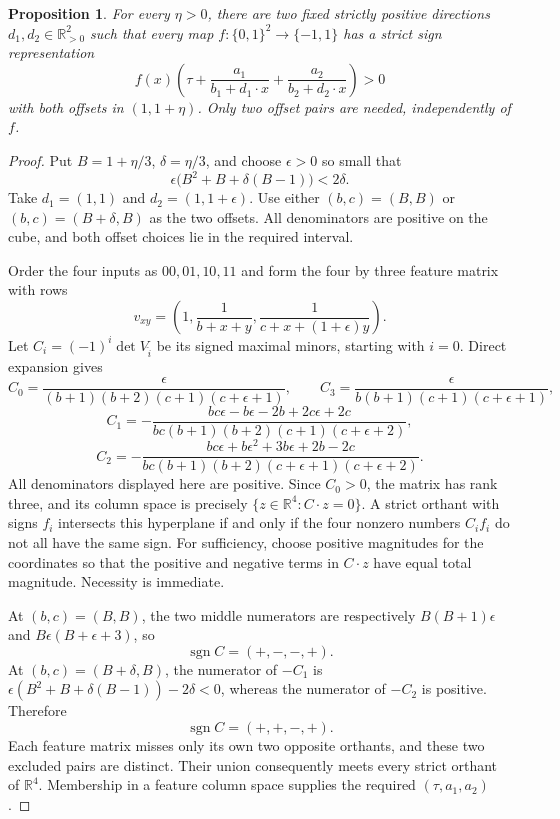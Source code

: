\documentclass[11pt]{article}
\newtheorem{proposition}{Proposition}
\begin{document}
\begin{proposition}
For every $\eta>0$, there are two fixed strictly positive directions
$d_1,d_2\in\mathbb R_{>0}^2$ such that every map
$f:\{0,1\}^2\longrightarrow\{-1,1\}$ has a strict sign representation
\[
 f(x)\left(\tau+\frac{a_1}{b_1+d_1\cdot x}
                   +\frac{a_2}{b_2+d_2\cdot x}\right)>0
\]
with both offsets in $(1,1+\eta)$. Only two offset pairs are needed,
independently of $f$.
\end{proposition}
\begin{proof}
Put $B=1+\eta/3$, $\delta=\eta/3$, and choose $\epsilon>0$ so small that
\[
 \epsilon\bigl(B^2+B+\delta(B-1)\bigr)<2\delta.
\]
Take $d_1=(1,1)$ and $d_2=(1,1+\epsilon)$. Use either $(b,c)=(B,B)$ or
$(b,c)=(B+\delta,B)$ as the two offsets. All denominators are positive
on the cube, and both offset choices lie in the required interval.

Order the four inputs as $00,01,10,11$ and form the four by three
feature matrix with rows
\[
 v_{xy}=\left(1,\frac1{b+x+y},
                  \frac1{c+x+(1+\epsilon)y}\right).
\]
Let $C_i=(-1)^i\det V_{\widehat i}$ be its signed maximal minors, starting
with $i=0$. Direct expansion gives
\[
 C_0=\frac{\epsilon}{(b+1)(b+2)(c+1)(c+\epsilon+1)},\qquad
 C_3=\frac{\epsilon}{b(b+1)(c+1)(c+\epsilon+1)},
\]
\[
 C_1=-\frac{bc\epsilon-b\epsilon-2b+2c\epsilon+2c}
 {bc(b+1)(b+2)(c+1)(c+\epsilon+2)},
\]
\[
 C_2=-\frac{bc\epsilon+b\epsilon^2+3b\epsilon+2b-2c}
 {bc(b+1)(b+2)(c+\epsilon+1)(c+\epsilon+2)}.
\]
All denominators displayed here are positive. Since $C_0>0$, the matrix
has rank three, and its column space is precisely
$\{z\in\mathbb R^4:C\cdot z=0\}$. A strict orthant with signs $f_i$
intersects this hyperplane if and only if the four nonzero numbers
$C_i f_i$ do not all have the same sign. For sufficiency, choose positive
magnitudes for the coordinates so that the positive and negative terms
in $C\cdot z$ have equal total magnitude. Necessity is immediate.

At $(b,c)=(B,B)$, the two middle numerators are respectively
$B(B+1)\epsilon$ and $B\epsilon(B+\epsilon+3)$, so
\[
 \operatorname{sgn} C=(+,-,-,+).
\]
At $(b,c)=(B+\delta,B)$, the numerator of $-C_1$ is
$\epsilon(B^2+B+\delta(B-1))-2\delta<0$, whereas the numerator of
$-C_2$ is positive. Therefore
\[
 \operatorname{sgn} C=(+,+,-,+).
\]
Each feature matrix misses only its own two opposite orthants, and these
two excluded pairs are distinct. Their union consequently meets every
strict orthant of $\mathbb R^4$. Membership in a feature column space
supplies the required $(\tau,a_1,a_2)$.
\end{proof}
\end{document}
